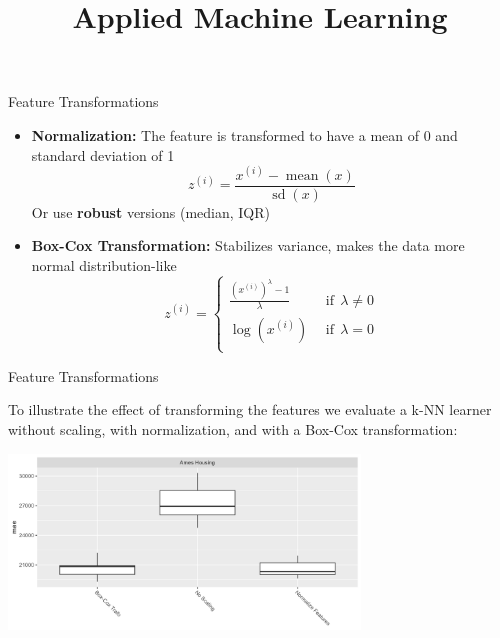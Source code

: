 \documentclass[11pt,compress,t,notes=noshow, xcolor=table]{beamer}
\title{Applied Machine Learning}
\date{}
\begin{document}



\begin{vbframe}{Feature Transformations}

\begin{itemize}
\item \textbf{Normalization:} The feature is transformed to have a mean of 0 and standard deviation of 1
    $$z^{(i)} = \frac{x^{(i)} - \operatorname{mean}(x)}{\operatorname{sd}(x)}$$
    Or use \textbf{robust} versions (median, IQR)

\lz

\item \textbf{Box-Cox Transformation:} Stabilizes variance, makes the data more normal distribution-like
    $$z^{(i)} = \left\{\begin{array}{cc}
    \frac{\left(x^{(i)}\right)^\lambda - 1}{\lambda} & \ \ \text{if} \ \ \lambda \neq 0 \\
    \log(x^{(i)}) & \ \ \text{if} \ \ \lambda = 0 \\
    \end{array}\right.$$
\end{itemize}

\end{vbframe}

\begin{vbframe}{Feature Transformations}

To illustrate the effect of transforming the features we evaluate a k-NN learner without scaling, with normalization, and with a Box-Cox transformation:

\vfill

\begin{center}
\includegraphics[width = 0.7\textwidth]{figure/02_feature_transformation_knn.png}
\end{center}

\vfill

\end{vbframe}
\end{document}
